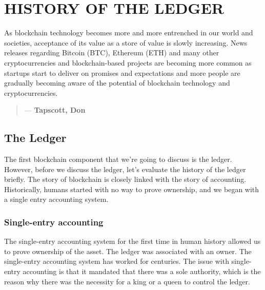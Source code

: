 \chapter{HISTORY OF THE LEDGER}
\label{ch:Ledger}

As blockchain technology becomes more and more entrenched in our world and societies, acceptance of its value as a store of value is slowly increasing. News releases regarding Bitcoin (BTC), Ethereum (ETH) and many other cryptocurrencies and blockchain-based projects are becoming more common as startups start to deliver on promises and expectations and more people are gradually becoming aware of the potential of blockchain technology and cryptocurrencies.
 
\begin{quotation}

      \textit{}
      \begin{flushright}
        \small{--- \textbf{Tapscott, Don}}
      \end{flushright}
    
\end{quotation}

 
 \section{The Ledger}
The first blockchain component that we're going to discuss is the ledger. However, before we discuss the ledger, let's evaluate the history of the ledger briefly. The story of blockchain is closely linked with the story of accounting. Historically, humans started with no way to prove ownership, and we began with a single entry accounting system.

\subsection{Single-entry accounting}
The single-entry accounting system for the first time in human history allowed us to prove ownership of the asset. The ledger was associated with an owner. The single-entry accounting system has worked for centuries. The issue with single-entry accounting is that it mandated that there was a sole authority, which is the reason why there was the necessity for a king or a queen to control the ledger.\medskip

